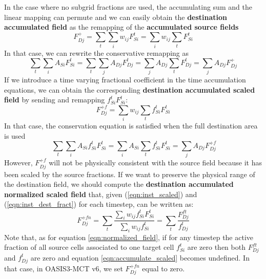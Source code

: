In the case where no subgrid fractions are used, the accumulating sum and the linear mapping can permute and we can easily obtain the {\bf destination accumulated field} as the remapping of the {\bf accumulated source fields}
\begin{equation}\label{destination_accumulated}
F^+_{Dj}=\sum_t{\sum_i{w_{ij}F^t_{Si}}} = \sum_i{w_{ij}\sum_t{ F^t_{Si}}}
\end{equation}
In that case, we can rewrite the conservative remapping as
\begin{equation} 
\sum_t{\sum_i{A_{Si}F^t_{Si}}} = \sum_t{\sum_j{A_{Dj}F^t_{Dj}}} = \sum_jA_{Dj}{\sum_t{F^t_{Dj}}} = \sum_j{A_{Dj}F^+_{Dj}}
\end{equation}
If we introduce a time varying fractional coefficient in the time accumulation equations, we can obtain the corresponding {\bf destination accumulated scaled field} by sending and remapping \(f^t_{Si}F^t_{Si}\):
\begin{equation}\label{eqn:nonnorm_accumulate_scaled}
F^{+f}_{Dj} = \sum_iw_{ij}\sum_t{f^t_{Si}F^t_{Si}}
\end{equation}
In that case, the conservation equation is satisfied when the full destination area is used
\begin{equation}\
\sum_t{\sum_i{A_{Si}f^t_{Si}F^t_{Si}}} = \sum_i{A_{Si}\sum_t{f^t_{Si}F^t_{Si}}} = \sum_j{A_{Dj}F^{+f}_{Dj}}
\end{equation}
However, \(F^{+f}_{Dj}\) will not be physically consistent with the source field because it has been scaled by the source fractions.  If we want to preserve the physical range of the destination field, we should compute the {\bf destination accumulated  normalized scaled field} that, given (\ref{eqn:inst_scaled}) and (\ref{eqn:inst_dest_fract}) for each timestep, can be written as:
\begin{equation}\label{eqn:accumulate_scaled}
F^{+fn}_{Dj}=\sum_t{\frac{\sum_i{w_{ij}f^t_{Si}F^t_{Si}}}{\sum_i{w_{ij}f^t_{Si}}}}=\sum_t{\frac{F^{ft}_{Dj}}{f^t_{Dj}}}    
\end{equation}
Note that, as for equation \ref{eqn:normalized_field}, if for any timestep the active fraction of all source cells associated to one target cell \(f^{t}_{Si}\) are zero then both \(F^{ft}_{Dj}\) and \(f^{t}_{Dj}\) are zero and equation \ref{eqn:accumulate_scaled} becomes undefined. In that case, in OASIS3-MCT v6, we set \(F^{+fn}_{Dj}\) equal to zero.

